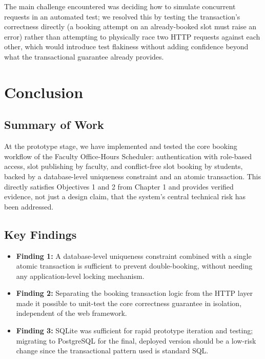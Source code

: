 \documentclass{tietreport}
\begin{document}
The main challenge encountered was deciding how to
simulate concurrent requests in an automated test; we
resolved this by testing the transaction's correctness
directly (a booking attempt on an already-booked slot must
raise an error) rather than attempting to physically
race two HTTP requests against each other, which would
introduce test flakiness without adding confidence beyond
what the transactional guarantee already provides.


\chapter{Conclusion}

\section{Summary of Work}

At the prototype stage, we have implemented and tested the
core booking workflow of the Faculty Office-Hours
Scheduler: authentication with role-based access, slot
publishing by faculty, and conflict-free slot booking by
students, backed by a database-level uniqueness constraint
and an atomic transaction. This directly satisfies
Objectives 1 and 2 from Chapter 1 and provides verified
evidence, not just a design claim, that the system's
central technical risk has been addressed.

\section{Key Findings}

\begin{itemize}
  \item \textbf{Finding 1:} A database-level uniqueness
    constraint combined with a single atomic transaction
    is sufficient to prevent double-booking, without
    needing any application-level locking mechanism.
  \item \textbf{Finding 2:} Separating the booking
    transaction logic from the HTTP layer made it possible
    to unit-test the core correctness guarantee in
    isolation, independent of the web framework.
  \item \textbf{Finding 3:} SQLite was sufficient for rapid
    prototype iteration and testing; migrating to
    PostgreSQL for the final, deployed version should be a
    low-risk change since the transactional pattern used
    is standard SQL.
\end{itemize}
\end{document}
